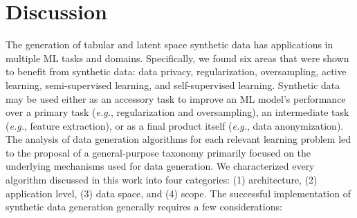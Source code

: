 \section{Discussion}\label{sec:discussion}

The generation of tabular and latent space synthetic data has applications in
multiple ML tasks and domains. Specifically, we found six areas that were
shown to benefit from synthetic data: data privacy, regularization,
oversampling, active learning, semi-supervised learning, and self-supervised
learning. Synthetic data may be used either as an accessory task to improve
an ML model's performance over a primary task (\textit{e.g.},
regularization and oversampling), an intermediate task (\textit{e.g.}, feature
extraction), or as a final product itself (\textit{e.g.}, data anonymization).
The analysis of data generation algorithms for each relevant learning problem
led to the proposal of a general-purpose taxonomy primarily focused on the
underlying mechanisms used for data generation. We characterized every
algorithm discussed in this work into four categories: (1) architecture, (2)
application level, (3) data space, and (4) scope. The successful implementation
of synthetic data generation generally requires a few considerations:


